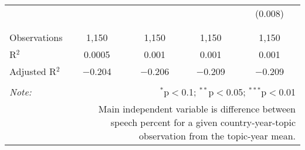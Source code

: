 \begin{table}[!htbp]
\begin{tabular}{@{\extracolsep{5pt}}lcccc}
  &  &  &  & (0.008) \\ 
  & & & & \\ 
\hline \\[-1.8ex] 
Observations & 1,150 & 1,150 & 1,150 & 1,150 \\ 
R$^{2}$ & 0.0005 & 0.001 & 0.001 & 0.001 \\ 
Adjusted R$^{2}$ & $-$0.204 & $-$0.206 & $-$0.209 & $-$0.209 \\ 
\hline 
\hline \\[-1.8ex] 
\textit{Note:}  & \multicolumn{4}{r}{$^{*}$p$<$0.1; $^{**}$p$<$0.05; $^{***}$p$<$0.01} \\ 
 & \multicolumn{4}{r}{Main independent variable is difference between speech percent for a given country-year-topic observation from the topic-year mean.} \\ 
\end{tabular} 
\end{table} 
